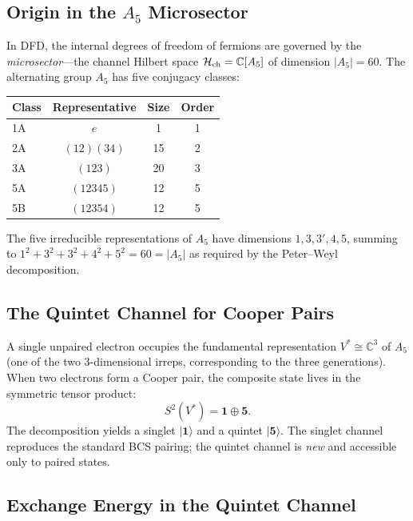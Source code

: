 \documentclass[12pt,a4paper]{article}
\theoremstyle{definition}
\theoremstyle{remark}
\begin{document}
\subsection{Origin in the $A_5$ Microsector}

In DFD, the internal degrees of freedom of fermions are governed by the
\emph{microsector}---the channel Hilbert space
$\mathcal{H}_{\rm ch} = \mathbb{C}[A_5]$ of dimension $|A_5| = 60$.
The alternating group $A_5$ has five conjugacy classes:

\begin{center}
\renewcommand{\arraystretch}{1.3}
\begin{tabular}{lccc}
\toprule
Class & Representative & Size & Order \\
\midrule
1A & $e$ & 1 & 1 \\
2A & $(12)(34)$ & 15 & 2 \\
3A & $(123)$ & 20 & 3 \\
5A & $(12345)$ & 12 & 5 \\
5B & $(12354)$ & 12 & 5 \\
\bottomrule
\end{tabular}
\end{center}

The five irreducible representations of $A_5$ have dimensions $1, 3, 3', 4, 5$,
summing to $1^2 + 3^2 + 3^2 + 4^2 + 5^2 = 60 = |A_5|$ as required by the
Peter--Weyl decomposition.

\subsection{The Quintet Channel for Cooper Pairs}

A single unpaired electron occupies the fundamental representation $V^* \cong
\mathbb{C}^3$ of $A_5$ (one of the two 3-dimensional irreps, corresponding to
the three generations).  When two electrons form a Cooper pair, the composite
state lives in the symmetric tensor product:
\begin{equation}\label{eq:S2V}
S^2(V^*) = \mathbf{1} \oplus \mathbf{5}.
\end{equation}
The decomposition yields a singlet $|\mathbf{1}\rangle$ and a quintet
$|\mathbf{5}\rangle$.  The singlet channel reproduces the standard BCS pairing;
the quintet channel is \emph{new} and accessible only to paired states.

\subsection{Exchange Energy in the Quintet Channel}
\end{document}
